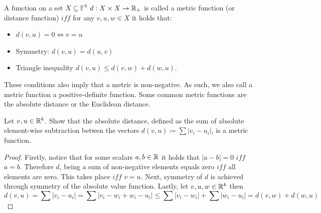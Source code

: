 \begin{definition}[Metric]
A function on a set $X\subseteq \mathbb{F}^k$ $d:X\times X\rightarrow \mathbb{R}_+$ is called a metric function (or distance function) $iff$ for any $v,u,w\in X$ it holds that:
\begin{itemize}
	\item $d\left(v,u\right)=0\iff v=u$
	\item Symmetry: $d\left(v,u\right) = d\left(u,v\right)$
	\item Triangle inequality $d\left(v,u\right) \leq d\left(v,w\right)+d\left(w,u\right)$.
\end{itemize}
\end{definition}
These conditions also imply that a metric is non-negative. As such, we also call a metric function a positive-definite function. Some common metric functions are the absolute distance or the Euclidean distance.

\begin{exercise}
Let $v,u\in\mathbb{R}^k$. Show that the absolute distance, defined as the sum of absolute element-wise subtraction betwen the vectors $d\left(v,u\right)\coloneqq \sum \left|v_i-u_i\right|$, is a metric function.
\end{exercise}
\begin{proof}
Firstly, notice that for some scalars $a,b\in\mathbb{R}$ it holds that $\left|a-b\right|=0$ $iff$ $a=b$. Therefore $d$, being a sum of non-negative elements equals zero $iff$ all elements are zero. This takes place $iff$ $v=u$. Next, symmetry of $d$ is achieved through symmetry of the absolute value function. Lastly, let $v,u,w\in\mathbb{R}^k$ then $$ d\left(v,u\right) = \sum\left|v_i-u_i\right| = \sum\left|v_i - w_i + w_i - u_i\right| \leq \sum\left|v_i-w_i\right| + \sum\left|w_i-u_i\right| = d\left(v,w\right) + d\left(w,u\right) $$
\end{proof}

